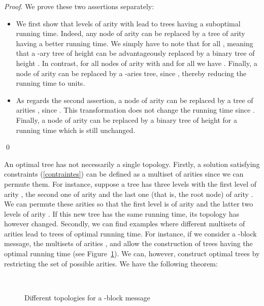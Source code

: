 \documentclass{llncs}
\renewenvironment{proof}{\paragraph{Proof} }{\hfill\qed}
\renewcommand{\paragraph}[1]{\noindent\textit{#1}.}
\begin{document}
\begin{proof}
We prove these two assertions separately:
\begin{itemize}
 \item We first show that levels of arity  with  lead to trees having a suboptimal running time.
Indeed, any node of arity  can be replaced by a tree of arity  having a better running time. 
We simply have to note that  for all , meaning that
a -ary tree of height  can be advantageously replaced by a binary tree of height . 
In contrast, for all nodes of arity  with  and for all  
we have . 
Finally, a node of arity  can be replaced by a -aries tree, since ,
thereby reducing the running time to  units. 
 \item As regards the second assertion, a node of arity  can be replaced by a tree of arities , since . 
This transformation does not
change the running time since . Finally, a node of arity  can be replaced by a binary tree of height  for a running time
which is still unchanged.
\end{itemize}
\end{proof}

An optimal tree has not necessarily a single topology. Firstly, a solution satisfying constraints
(\ref{contraintes}) can be defined as a multiset of arities since we can permute them.
For instance, suppose a tree has three levels with the first level of arity , the second one of arity  and the last one (that is, the root node) 
of arity . We can permute these arities so that the first level is of arity  and the latter two levels of arity . 
If this new tree has the same running time, its topology has however changed.
Secondly, we can find examples where different multisets of arities lead to trees of optimal running time. For instance, if we consider a -block message, 
the multisets of arities ,  and  allow the construction of trees having the optimal running time (see 
Figure~\ref{Same_running_time_different_trees}).
We can, however, construct optimal trees by restricting the set of possible arities. We have the following theorem:


\begin{figure}[t!]
\centering
{}
~~~~~~~~~~


\vspace{0.75cm}
\caption{Different topologies for a -block message}
\label{Same_running_time_different_trees}
\end{figure}
\end{document}
